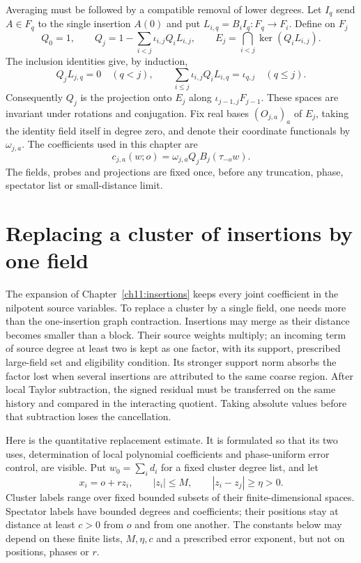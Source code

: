 Averaging must be followed by a compatible removal of lower degrees.
Let $I_q$ send $A\in F_q$ to the single insertion $A(0)$ and put
$L_{i,q}=B_iI_q:F_q\to F_i$. Define on $F_j$
\begin{equation}
 Q_0=1,\qquad
 Q_j=1-\sum_{i<j}\iota_{i,j}Q_iL_{i,j},\qquad
 E_j=\bigcap_{i<j}\ker(Q_iL_{i,j}).
 \label{ch18:graded}
\end{equation}
The inclusion identities give, by induction,
\[
 Q_jL_{j,q}=0\quad(q<j),\qquad
 \sum_{i\le j}\iota_{i,j}Q_iL_{i,q}=\iota_{q,j}\quad(q\le j).
\]
Consequently $Q_j$ is the projection onto $E_j$ along
$\iota_{j-1,j}F_{j-1}$. These spaces are invariant under rotations
and conjugation. Fix real bases $(O_{j,a})_a$ of $E_j$, taking the
identity field itself in degree zero, and denote their coordinate functionals
by $\omega_{j,a}$. The coefficients used in this chapter are
\begin{equation}
 c_{j,a}(w;o)=\omega_{j,a}Q_jB_j(\tau_{-o}w).
 \label{ch18:coefficients}
\end{equation}
The fields, probes and projections are fixed once, before any
truncation, phase, spectator list or small-distance limit.


\section{Replacing a cluster of insertions by one field}
\label{ch18:input}

The expansion of Chapter~\ref{ch11:insertions} keeps every joint
coefficient in the nilpotent source variables. To replace a cluster by a single field,
one needs more than the one-insertion graph contraction. Insertions may
merge as their distance becomes smaller than a block. Their source
weights multiply; an incoming term of source degree at least two is kept as one factor,
with its support, prescribed large-field set and eligibility condition. Its stronger support
norm absorbs the factor lost when several insertions are attributed to the same coarse
region. After local Taylor subtraction, the signed residual must be
transferred on the same history and compared in the interacting quotient.
Taking absolute values before that subtraction loses the cancellation.

Here is the quantitative replacement estimate. It is formulated
so that its two uses, determination of local polynomial coefficients
and phase-uniform error control, are visible. Put $w_0=\sum_i d_i$ for a fixed cluster degree
list, and let
\[
 x_i=o+r z_i,\qquad |z_i|\le M,\qquad |z_i-z_j|\ge\eta>0.
\]
Cluster labels range over fixed bounded subsets of their finite-dimensional
spaces. Spectator labels have bounded degrees and coefficients; their
positions stay at distance at least $c>0$ from $o$ and from one another.
The constants below may depend on these finite lists, $M,\eta,c$ and
a prescribed error exponent, but not on positions, phases or $r$.


